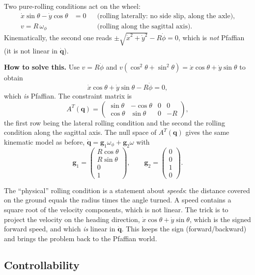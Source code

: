 \documentclass[11pt,a4paper]{article}
\theoremstyle{definition}
\theoremstyle{plain}
\newcommand{\R}{\mathbb{R}}
\newcommand{\qv}{\bm{q}}
\begin{document}
Two pure-rolling conditions act on the wheel:
\begin{align*}
 \dot x\sin\theta-\dot y\cos\theta&=0 &&\text{(rolling laterally: no side slip, along the axle)},\\
 v=R\,\omega_\phi &&&\text{(rolling along the sagittal axis)}.
\end{align*}
Kinematically, the second one reads $\pm\sqrt{\dot x^2+\dot y^2}-R\dot\phi=0$, which is \emph{not} Pfaffian (it is not linear in $\dot{\qv}$).

\textbf{How to solve this.} Use $v=R\dot\phi$ and $v(\cos^2\theta+\sin^2\theta)=\dot x\cos\theta+\dot y\sin\theta$ to obtain
\[
 \dot x\cos\theta+\dot y\sin\theta-R\dot\phi=0 ,
\]
which \emph{is} Pfaffian. The constraint matrix is
\[
 A^T(\qv)=\begin{pmatrix}\sin\theta&-\cos\theta&0&0\\ \cos\theta&\sin\theta&0&-R\end{pmatrix},
\]
the first row being the lateral rolling condition and the second the rolling condition along the sagittal axis. The null space of $A^T(\qv)$ gives the same kinematic model as before, $\dot{\qv}=\bm g_1\omega_\phi+\bm g_2\omega$ with
\[
 \bm g_1=\begin{pmatrix}R\cos\theta\\R\sin\theta\\0\\1\end{pmatrix},\qquad
 \bm g_2=\begin{pmatrix}0\\0\\1\\0\end{pmatrix}.
\]

\begin{intuition}
The ``physical'' rolling condition is a statement about \emph{speeds}: the distance covered on the ground equals the radius times the angle turned. A speed contains a square root of the velocity components, which is not linear. The trick is to project the velocity on the heading direction, $\dot x\cos\theta+\dot y\sin\theta$, which is the signed forward speed, and which \emph{is} linear in $\dot{\qv}$. This keeps the sign (forward/backward) and brings the problem back to the Pfaffian world.
\end{intuition}

\subsection{Controllability}
\end{document}
